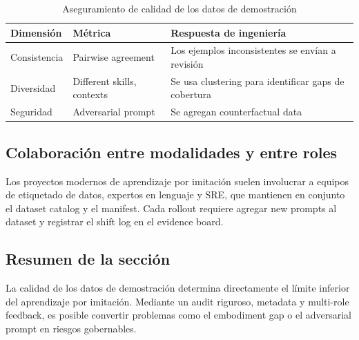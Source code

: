 \begin{table}[H]
\centering
\begin{tabular}{p{} p{} p{}}
\toprule
Dimensión & Métrica & Respuesta de ingeniería \\
\midrule
Consistencia & Pairwise agreement & Los ejemplos inconsistentes se envían a revisión \\
Diversidad & Different skills, contexts & Se usa clustering para identificar gaps de cobertura \\
Seguridad & Adversarial prompt & Se agregan counterfactual data \\
\bottomrule
\end{tabular}
\caption{Aseguramiento de calidad de los datos de demostración}
\end{table}

\subsection{Colaboración entre modalidades y entre roles}

Los proyectos modernos de aprendizaje por imitación suelen involucrar a equipos de etiquetado de datos, expertos en lenguaje y SRE, que mantienen en conjunto el dataset catalog y el manifest. Cada rollout requiere agregar new prompts al dataset y registrar el shift log en el evidence board.

\subsection{Resumen de la sección}

La calidad de los datos de demostración determina directamente el límite inferior del aprendizaje por imitación. Mediante un audit riguroso, metadata y multi-role feedback, es posible convertir problemas como el embodiment gap o el adversarial prompt en riesgos gobernables.

